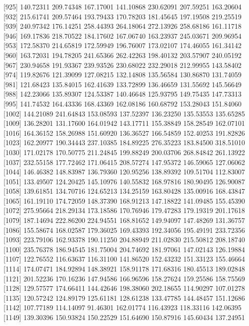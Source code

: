 \documentclass[
  10pt,
  a4paper,oneside]{article}
\begin{document}
{[}925{]} 140.72311 209.74348 167.17001 141.10868 230.62091 207.59251 163.20604
{[}932{]} 215.61741 209.57464 193.79433 170.78203 181.45645 197.19508 219.25519
{[}939{]} 240.97342 176.14251 258.44393 264.18064 272.13926 258.68186 161.11718
{[}946{]} 169.17836 218.70522 184.17602 167.06740 163.23937 245.03671 209.96954
{[}953{]} 172.58370 214.65819 172.59949 196.76007 173.02107 174.46055 161.34142
{[}960{]} 163.72031 194.78205 241.65366 262.42263 198.40132 203.57907 240.05192
{[}967{]} 230.94658 191.93367 239.93526 230.68022 232.29018 212.99955 143.58402
{[}974{]} 119.82676 121.39099 127.08215 132.14808 135.56584 130.86870 131.74059
{[}981{]} 121.68423 135.84015 162.41639 133.72899 136.46659 131.55692 145.56649
{[}988{]} 142.23066 135.89307 124.53387 140.46648 125.93795 149.75435 147.73313
{[}995{]} 141.74532 164.43336 168.43369 162.08186 160.68792 153.28043 151.84060
{[}1002{]} 144.21089 241.64843 153.08593 137.52397 136.23250 135.53553 135.65285
{[}1009{]} 136.28201 131.17600 164.01942 143.17711 155.38849 158.28549 162.07101
{[}1016{]} 164.36152 158.26988 151.60920 136.36527 166.54859 152.40253 191.82826
{[}1023{]} 162.20977 190.34443 237.10385 184.89225 276.35223 183.84500 318.51010
{[}1030{]} 171.02178 170.50775 211.24845 199.88249 200.03706 268.84842 261.13922
{[}1037{]} 232.55158 177.72462 171.06415 208.57274 147.95372 146.59065 127.06062
{[}1044{]} 146.46382 148.83987 136.79360 120.95256 138.89392 109.51704 112.83007
{[}1051{]} 133.49507 124.20425 145.10976 140.55832 168.97816 180.90495 126.90087
{[}1058{]} 139.61851 134.70716 124.65213 134.25159 163.80428 135.00916 168.43847
{[}1065{]} 161.19110 174.72059 148.37390 168.91213 147.18822 141.09485 155.45390
{[}1072{]} 275.95664 218.29134 173.18586 170.76946 179.47283 179.19319 201.17618
{[}1079{]} 187.14694 222.86200 224.94551 168.81652 149.94097 147.48269 131.36757
{[}1086{]} 155.58674 168.02587 179.36025 169.43393 192.34056 195.49191 233.72356
{[}1093{]} 223.79106 162.93378 190.11250 204.88949 211.02830 215.50812 208.18740
{[}1100{]} 235.76378 186.94545 181.75004 204.74692 181.97061 147.02143 126.19884
{[}1107{]} 122.76552 116.63637 116.31100 141.86520 152.43232 151.33123 155.46664
{[}1114{]} 174.07471 184.92894 148.38921 158.91178 171.68316 180.45513 189.02848
{[}1121{]} 201.52236 170.16236 147.94586 166.96596 158.27624 159.25586 158.75569
{[}1128{]} 129.57577 174.66411 144.42646 198.38060 202.18655 114.90297 107.01278
{[}1135{]} 120.57242 124.89179 125.61181 128.61238 133.47785 144.48457 151.12686
{[}1142{]} 107.77189 114.14097 91.46301 162.01774 116.43923 118.33116 142.06395
{[}1149{]} 139.30396 150.93824 150.22529 151.64690 150.87916 145.60434 137.24951
\end{document}
